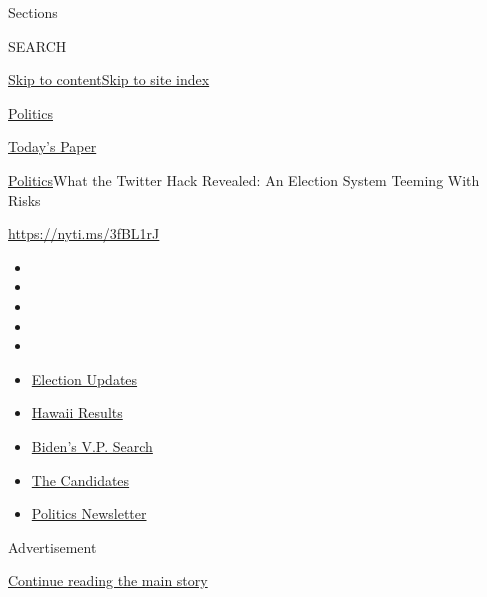Sections

SEARCH

\protect\hyperlink{site-content}{Skip to
content}\protect\hyperlink{site-index}{Skip to site index}

\href{https://www.nytimes.com/section/politics}{Politics}

\href{https://myaccount.nytimes.com/auth/login?response_type=cookie\&client_id=vi}{}

\href{https://www.nytimes.com/section/todayspaper}{Today's Paper}

\href{/section/politics}{Politics}\textbar{}What the Twitter Hack
Revealed: An Election System Teeming With Risks

\href{https://nyti.ms/3fBL1rJ}{https://nyti.ms/3fBL1rJ}

\begin{itemize}
\item
\item
\item
\item
\item
\end{itemize}

\begin{itemize}
\item
  \href{https://www.nytimes.com/2020/08/07/us/elections/biden-vs-trump.html?action=click\&pgtype=Article\&state=default\&region=TOP_BANNER\&context=storylines_menu}{Election
  Updates}
\item
  \href{https://www.nytimes.com/interactive/2020/08/08/us/elections/results-hawaii-primary-elections.html?action=click\&pgtype=Article\&state=default\&region=TOP_BANNER\&context=storylines_menu}{Hawaii
  Results}
\item
  \href{https://www.nytimes.com/article/biden-vice-president-2020.html?action=click\&pgtype=Article\&state=default\&region=TOP_BANNER\&context=storylines_menu}{Biden's
  V.P. Search}
\item
  \href{https://www.nytimes.com/interactive/2019/us/politics/2020-presidential-candidates.html?action=click\&pgtype=Article\&state=default\&region=TOP_BANNER\&context=storylines_menu}{The
  Candidates}
\item
  \href{https://www.nytimes.com/newsletters/politics?action=click\&pgtype=Article\&state=default\&region=TOP_BANNER\&context=storylines_menu}{Politics
  Newsletter}
\end{itemize}

Advertisement

\protect\hyperlink{after-top}{Continue reading the main story}

